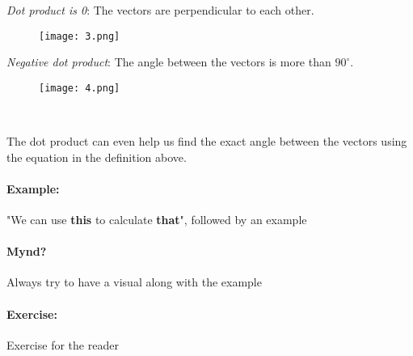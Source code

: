 \documentclass{article}
\begin{document}
\begin{minipage}{0.45\textwidth}
\begin{flushleft}
\textit{Dot product is 0}: The vectors are perpendicular to each other. 
\end{flushleft}
\end{minipage} \hfill
\begin{minipage}{0.45\textwidth}
\begin{figure}[H]
\texttt{[image: 3.png]}
\end{figure}
\end{minipage}


\begin{minipage}{0.45\textwidth}
\begin{flushleft}
\textit{Negative dot product}: The angle between the vectors is more than $90^\circ$.  
\end{flushleft}
\end{minipage} \hfill
\begin{minipage}{0.45\textwidth}
\begin{figure}[H]
\texttt{[image: 4.png]}
\end{figure}
\end{minipage}

\

The dot product can even help us find the exact angle between the vectors using the equation in the definition above. 

\paragraph{Example:} "We can use \textbf{this} to calculate \textbf{that}", followed by an example

\paragraph{Mynd?} Always try to have a visual along with the example

\paragraph{Exercise:} Exercise for the reader


%
\end{document}
